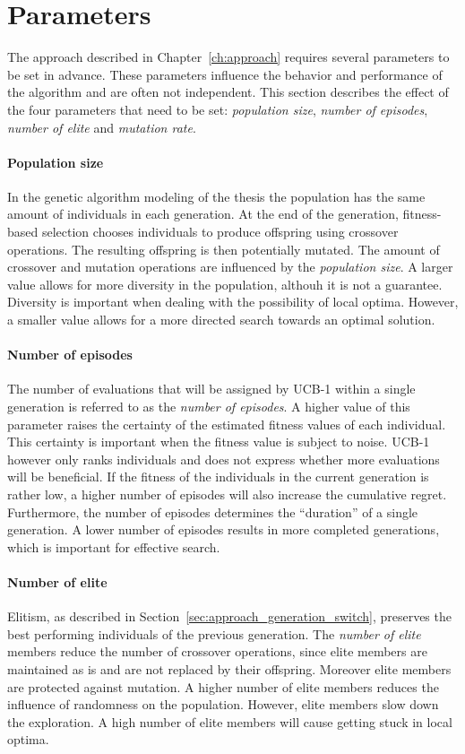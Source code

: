 \section{Parameters}
\label{sec:simulations_parameters}
The approach described in Chapter~\ref{ch:approach} requires several parameters
to be set in advance. These parameters influence the behavior and performance
of the algorithm and are often not independent. This section describes the
effect of the four parameters that need to be set: \emph{population size},
\emph{number of episodes}, \emph{number of elite} and \emph{mutation rate}.
\paragraph{Population size} In the genetic algorithm modeling of the thesis
the population has the same amount of individuals in each generation. At the
end of the generation, fitness-based selection chooses individuals to produce
offspring using crossover operations. The resulting offspring is then
potentially mutated. The amount of crossover and mutation operations are
influenced by the \emph{population size}. A larger value allows for more
diversity in the population, althouh it is not a guarantee. Diversity is
important when dealing with the possibility of local optima. However, a smaller
value allows for a more directed search towards an optimal solution.
\paragraph{Number of episodes} The number of evaluations that will be assigned
by UCB-1 within a single generation is referred to as the \emph{number of
episodes}. A higher value of this parameter raises the certainty of the
estimated fitness values of each individual. This certainty is important when
the fitness value is subject to noise. UCB-1 however only ranks individuals and
does not express whether more evaluations will be beneficial. If
the fitness of the individuals in the current generation is rather low, a
higher number of episodes will also increase the cumulative regret.
Furthermore, the number of episodes determines the ``duration'' of a single
generation. A lower number of episodes results in more completed generations,
which is important for effective search.
\paragraph{Number of elite}  Elitism, as described in Section~\ref{sec:approach_generation_switch},
preserves the best performing individuals of the previous generation. The
\emph{number of elite} members reduce the number of crossover operations, since
elite members are maintained as is and are not replaced by their offspring.
Moreover elite members are protected against mutation. A higher number of elite
members reduces the influence of randomness on the population. However, elite
members slow down the exploration. A high number of elite members will cause
getting stuck in local optima.
